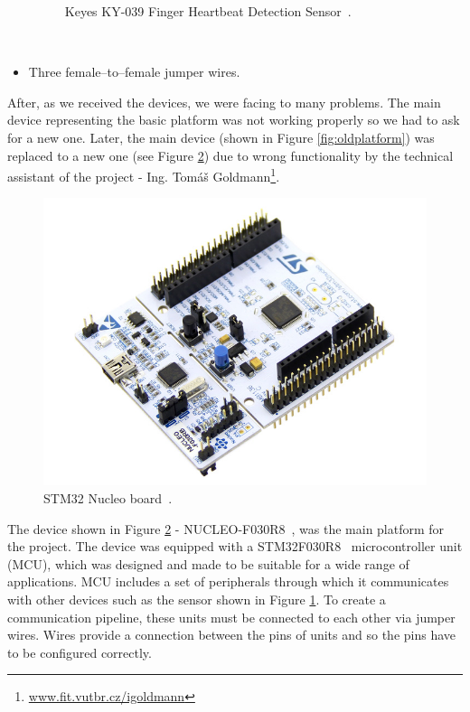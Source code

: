 \documentclass[11pt,a4paper]{article}
\newcommand{\tilda}{\raisebox{0.5ex}{\texttildelow}}
\begin{document}
\begin{itemize}
\begin{figure}[H]
            \caption{Keyes KY-039 Finger Heartbeat Detection Sensor~\cite{IMG-SENSOR-1}.}
            \label{fig:senzor1}
        \end{figure}
        \hfill\\[-18mm]
    \item Three female--to--female jumper wires.\\[-2.5mm]
\end{itemize}

\newpage

After, as we received the devices, we were facing to many problems. The main device representing the basic platform was not working properly so we had to ask for a new one. Later, the main device (shown in Figure \ref{fig:oldplatform}) was replaced to a new one (see Figure \ref{fig:platform1}) due to wrong functionality by the technical assistant of the project - Ing. Tomáš Goldmann\footnote{\href{http://www.fit.vutbr.cz/~igoldmann/}{www.fit.vutbr.cz/{\tilda}igoldmann}}.
\begin{figure}[H]
    \centering
    \includegraphics[scale=0.4]{img/device1.jpg}
    \caption{STM32 Nucleo board~\cite{IMG-DEVICE-1}.}
    \label{fig:platform1}
\end{figure}

\indent The device shown in Figure \ref{fig:platform1} - NUCLEO-F030R8~\cite{PLATFORM}, was the main platform for the project. The device was equipped with a STM32F030R8~\cite{MCU} microcontroller unit (MCU), which was designed and made to be suitable for a wide range of applications. MCU includes a set of peripherals through which it communicates with other devices such as the sensor shown in Figure \ref{fig:senzor1}. To create a communication pipeline, these units must be connected to each other via jumper wires. Wires provide a connection between the pins of units and so the pins have to be configured correctly.
\end{document}
